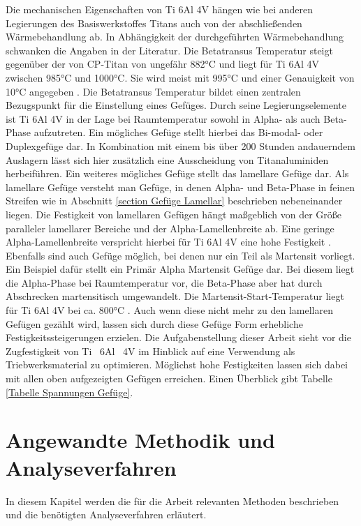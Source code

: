 \documentclass[a4paper, 11pt]{tubsreprt}
\begin{document}
Die mechanischen Eigenschaften von Ti 6Al 4V hängen wie bei anderen Legierungen des Basiswerkstoffes Titans auch von der abschließenden Wärmebehandlung ab. In Abhängigkeit der durchgeführten Wärmebehandlung schwanken die Angaben in der Literatur. Die Betatransus Temperatur steigt gegenüber der von CP-Titan von ungefähr 882°C \cite[s. 23]{Luetjering2007} und liegt für Ti 6Al 4V zwischen 985°C und 1000°C. Sie wird meist mit 995°C und einer Genauigkeit von 10°C angegeben \cite{Semiatin2003}\cite{Chen2008}. Die Betatransus Temperatur bildet einen zentralen Bezugspunkt für die Einstellung eines Gefüges. Durch seine Legierungselemente ist Ti 6Al 4V in der Lage bei Raumtemperatur sowohl in Alpha- als auch Beta-Phase aufzutreten.
Ein mögliches Gefüge stellt hierbei das Bi-modal- oder Duplexgefüge dar. In Kombination mit einem bis über 200 Stunden andauerndem Auslagern lässt sich hier zusätzlich eine Ausscheidung von Titanaluminiden  herbeiführen. 
Ein weiteres mögliches Gefüge stellt das lamellare Gefüge dar. Als lamellare Gefüge versteht man Gefüge, in denen Alpha- und Beta-Phase in feinen Streifen wie in Abschnitt \ref{section Gefüge Lamellar} beschrieben nebeneinander liegen. Die Festigkeit von lamellaren Gefügen hängt maßgeblich von der Größe paralleler lamellarer Bereiche und der Alpha-Lamellenbreite ab. Eine geringe Alpha-Lamellenbreite verspricht hierbei für Ti 6Al 4V eine hohe Festigkeit \cite{Sieniawski2013}. Ebenfalls sind auch Gefüge möglich, bei denen nur ein Teil als Martensit vorliegt. Ein Beispiel dafür stellt ein Primär Alpha Martensit Gefüge dar. Bei diesem liegt die Alpha-Phase bei Raumtemperatur vor, die Beta-Phase aber hat durch Abschrecken martensitisch umgewandelt. Die Martensit-Start-Temperatur liegt für Ti 6Al 4V bei ca. 800°C \cite{Boyer1994}. Auch wenn diese nicht mehr zu den lamellaren Gefügen gezählt wird, lassen sich durch diese Gefüge Form erhebliche Festigkeitssteigerungen erzielen. Die Aufgabenstellung dieser Arbeit sieht vor die Zugfestigkeit von Ti~ 6Al~ 4V im Hinblick auf eine Verwendung als Triebwerksmaterial zu optimieren. Möglichst hohe Festigkeiten lassen sich dabei mit allen oben aufgezeigten Gefügen erreichen. Einen Überblick gibt Tabelle \ref{Tabelle Spannungen Gefüge}.


\chapter{Angewandte Methodik und Analyseverfahren}

In diesem Kapitel werden die für die Arbeit relevanten Methoden beschrieben und die benötigten Analyseverfahren erläutert.
\end{document}
